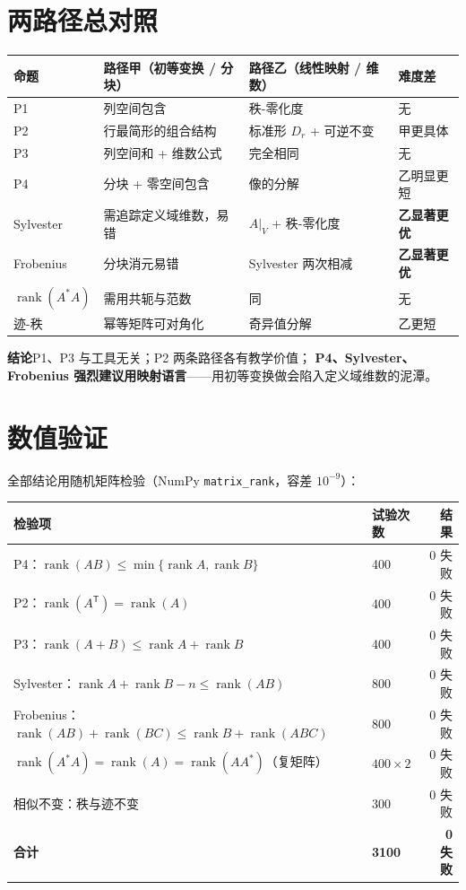 \documentclass[11pt]{ctexart}
\newcommand{\rank}{\operatorname{rank}}
\newcommand{\T}{^{\mathsf T}}
\begin{document}
\section{两路径总对照}
\begin{center}
\small
\begin{tabular}{@{}p{3.0cm}p{4.2cm}p{4.2cm}p{2.4cm}@{}}
\toprule
命题 & 路径甲（初等变换 / 分块） & 路径乙（线性映射 / 维数） & 难度差\\
\midrule
P1 & 列空间包含 & 秩-零化度 & 无\\
P2 & 行最简形的组合结构 & 标准形 $D_r$ + 可逆不变 & 甲更具体\\
P3 & 列空间和 + 维数公式 & 完全相同 & 无\\
P4 & 分块 + 零空间包含 & 像的分解 & 乙明显更短\\
Sylvester & 需追踪定义域维数，易错 & $A|_V$ + 秩-零化度 & \textbf{乙显著更优}\\
Frobenius & 分块消元易错 & Sylvester 两次相减 & \textbf{乙显著更优}\\
$\rank(A^{*}A)$ & 需用共轭与范数 & 同 & 无\\
迹-秩 & 幂等矩阵可对角化 & 奇异值分解 & 乙更短\\
\bottomrule
\end{tabular}
\end{center}

\textbf{结论}\quad P1、P3 与工具无关；P2 两条路径各有教学价值；
\textbf{P4、Sylvester、Frobenius 强烈建议用映射语言}——用初等变换做会陷入定义域维数的泥潭。

\section{数值验证}\label{sec:numeric}
全部结论用随机矩阵检验（NumPy \texttt{matrix\_rank}，容差 $10^{-9}$）：

\begin{center}
\begin{tabular}{@{}llr@{}}
\toprule
检验项 & 试验次数 & 结果\\
\midrule
P4：$\rank(AB)\le\min\{\rank A,\rank B\}$ & 400 & 0 失败\\
P2：$\rank(A\T)=\rank(A)$ & 400 & 0 失败\\
P3：$\rank(A+B)\le\rank A+\rank B$ & 400 & 0 失败\\
Sylvester：$\rank A+\rank B-n\le\rank(AB)$ & 800 & 0 失败\\
Frobenius：$\rank(AB)+\rank(BC)\le\rank B+\rank(ABC)$ & 800 & 0 失败\\
$\rank(A^{*}A)=\rank(A)=\rank(AA^{*})$（复矩阵） & $400\times2$ & 0 失败\\
相似不变：秩与迹不变 & 300 & 0 失败\\
\midrule
\textbf{合计} & \textbf{3100} & \textbf{0 失败}\\
\bottomrule
\end{tabular}
\end{center}
\end{document}

